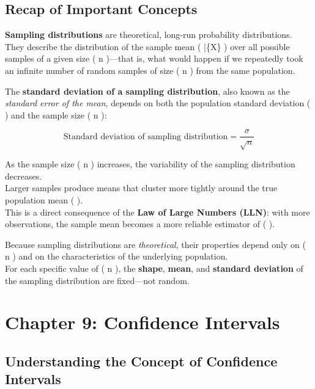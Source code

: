 \documentclass[
  letterpaper,
  DIV=11,
  numbers=noendperiod]{scrreprt}
\begin{document}
\section{Recap of Important Concepts}\label{recap-of-important-concepts}

\textbf{Sampling distributions} are theoretical, long-run probability
distributions.\\
They describe the distribution of the sample mean ( \bar\{X\} ) over all
possible samples of a given size ( n )---that is, what would happen if
we repeatedly took an infinite number of random samples of size ( n )
from the same population.

The \textbf{standard deviation of a sampling distribution}, also known
as the \emph{standard error of the mean}, depends on both the population
standard deviation ( \sigma ) and the sample size ( n ):

\[
\text{Standard deviation of sampling distribution} = \frac{\sigma}{\sqrt{n}}
\]

As the sample size ( n ) increases, the variability of the sampling
distribution decreases.\\
Larger samples produce means that cluster more tightly around the true
population mean ( \mu ).\\
This is a direct consequence of the \textbf{Law of Large Numbers (LLN)}:
with more observations, the sample mean becomes a more reliable
estimator of ( \mu ).

Because sampling distributions are \emph{theoretical}, their properties
depend only on ( n ) and on the characteristics of the underlying
population.\\
For each specific value of ( n ), the \textbf{shape}, \textbf{mean}, and
\textbf{standard deviation} of the sampling distribution are fixed---not
random.


\chapter{Chapter 9: Confidence
Intervals}\label{chapter-9-confidence-intervals}

\section{Understanding the Concept of Confidence
Intervals}\label{understanding-the-concept-of-confidence-intervals}
\end{document}
